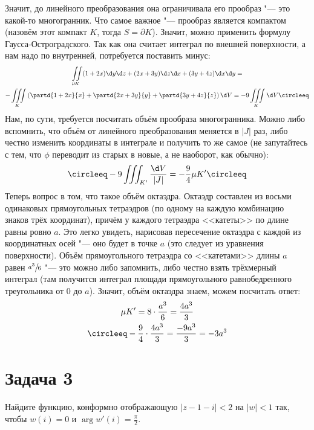 	Значит, до линейного преобразования она ограничивала его прообраз "--- это какой-то многогранник.
	Что самое важное "--- прообраз является компактом (назовём этот компакт $K$, тогда $S=\partial K$).
	Значит, можно применить формулу Гаусса-Остроградского.
	Так как она считает интеграл по внешней поверхности, а нам надо по внутренней, потребуется поставить минус:
	\begin{gather*}
		\iint\limits_{\partial K} (1+2x)\d y \d z + (2x+3y) \d z \d x + (3y + 4z) \d x \d y = \\
		-\iiint\limits_{K} \left(\partd{1+2x}{x} + \partd{2x+3y}{y} + \partd{3y+4z}{z}\right)\d V =
		-9\iiint\limits_K \d V \circleeq
	\end{gather*}
	Нам, по сути, требуется посчитать объём прообраза многогранника.
	Можно либо вспомнить, что объём от линейного преобразования меняется в $|J|$ раз, либо честно изменить координаты в интеграле и получить то же самое
	(не запутайтесь с тем, что $\phi$ переводит из старых в новые, а не наоборот, как обычно):
	\begin{gather*}
		\circleeq -9\iiint_{K'} \frac{\d V}{|J|} = -\frac{9}{4} \mu K' \circleeq
	\end{gather*}
	Теперь вопрос в том, что такое объём октаэдра.
	Октаэдр составлен из восьми одинаковых прямоугольных тетраэдров (по одному на каждую комбинацию знаков трёх координат),
	причём у каждого тетраэдра <<катеты>> по длине равны ровно $a$.
	Это легко увидеть, нарисовав пересечение октаэдра с каждой из координатных осей "--- оно будет в точке $a$ (это следует из уравнения поверхности).
	Объём прямоугольного тетраэдра со <<катетами>> длины $a$ равен $\sfrac{a^3}{6}$ "--- это можно либо запомнить, либо честно взять трёхмерный интеграл
	(там получится интеграл площади прямоугольного равнобедренного треугольника от 0 до $a$).
	Значит, объём октаэдра знаем, можем посчитать ответ:
	\begin{gather*}
		\mu K' = 8 \cdot \frac{a^3}{6} = \frac{4a^3}{3} \\
		\circleeq -\frac{9}{4} \cdot \frac{4a^3}{3} = \frac{-9a^3}{3} = -3a^3
	\end{gather*}

\section{Задача 3}
	Найдите функцию, конформно отображающую $|z-1-i|<2$ на $|w|<1$ так, чтобы $w(i)=0$ и $\arg w'(i) = \frac{\pi}{2}$.

